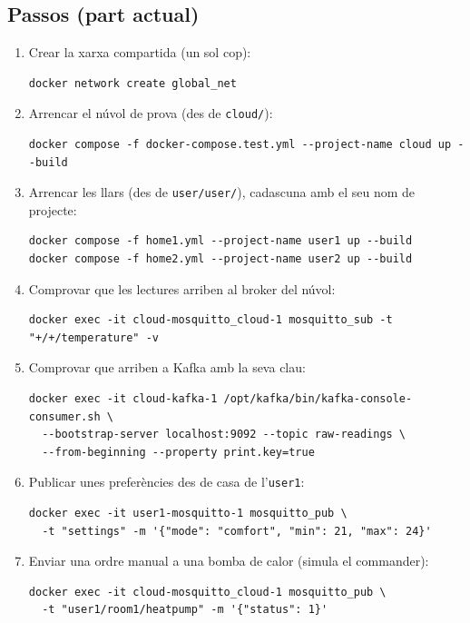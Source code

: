 \documentclass[11pt,a4paper]{article}
\begin{document}
\subsection*{Passos (part actual)}
\begin{enumerate}
  \item Crear la xarxa compartida (un sol cop):
\begin{lstlisting}
docker network create global_net
\end{lstlisting}
  \item Arrencar el núvol de prova (des de \texttt{cloud/}):
\begin{lstlisting}
docker compose -f docker-compose.test.yml --project-name cloud up --build
\end{lstlisting}
  \item Arrencar les llars (des de \texttt{user/user/}), cadascuna amb el seu
        nom de projecte:
\begin{lstlisting}
docker compose -f home1.yml --project-name user1 up --build
docker compose -f home2.yml --project-name user2 up --build
\end{lstlisting}
  \item Comprovar que les lectures arriben al broker del núvol:
\begin{lstlisting}
docker exec -it cloud-mosquitto_cloud-1 mosquitto_sub -t "+/+/temperature" -v
\end{lstlisting}
  \item Comprovar que arriben a Kafka amb la seva clau:
\begin{lstlisting}
docker exec -it cloud-kafka-1 /opt/kafka/bin/kafka-console-consumer.sh \
  --bootstrap-server localhost:9092 --topic raw-readings \
  --from-beginning --property print.key=true
\end{lstlisting}
  \item Publicar unes preferències des de casa de l'\texttt{user1}:
\begin{lstlisting}
docker exec -it user1-mosquitto-1 mosquitto_pub \
  -t "settings" -m '{"mode": "comfort", "min": 21, "max": 24}'
\end{lstlisting}
  \item Enviar una ordre manual a una bomba de calor (simula el commander):
\begin{lstlisting}
docker exec -it cloud-mosquitto_cloud-1 mosquitto_pub \
  -t "user1/room1/heatpump" -m '{"status": 1}'
\end{lstlisting}
\end{enumerate}
\end{document}
